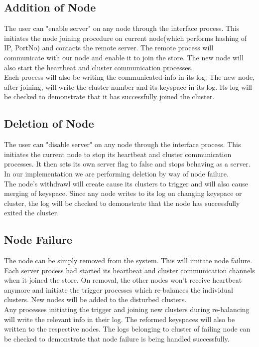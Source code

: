 \documentclass{article}
\begin{document}
\subsection{Addition of Node}
The user can "enable server" on any node through the interface process. This  initiates the node joining procedure on current node(which performs hashing of IP, PortNo) and contacts the remote server. The remote process will communicate with our node and enable it to join the store. The new node will also start the heartbeat and cluster communication processes. \\
Each process will also be writing the communicated info in its log. The new node, after joining, will write the cluster number and its keyspace in its log. Its log will be checked to demonstrate that it has successfully joined the cluster. 

\subsection{Deletion of Node}
The user can "disable server" on any node through the interface process. This  initiates the current node to stop its heartbeat and cluster communication processes. It then sets its own server flag to false and stops behaving as a server. In our implementation we are performing deletion by way of node failure.  \\
The node's withdrawl will create cause its clusters to trigger and will also cause merging of keyspace. Since any node writes to its log on changing keyspace or cluster, the log will be checked to demonstrate that the node has successfully exited the cluster. 

\subsection{Node Failure}
The node can be simply removed from the system. This will imitate node failure. Each server process had started its heartbeat and cluster communication channels when it joined the store. On removal, the other nodes won't receive heartbeat anymore and initiate the trigger processes which re-balances the individual clusters. New nodes will be added to the disturbed clusters.\\
Any processes initiating the trigger and joining new clusters during re-balancing will write the relevant info in their log. The reformed keyspaces will also be written to the respective nodes. 
The logs belonging to cluster of failing node can be checked to demonstrate that node failure is being handled successfully. 
\end{document}
